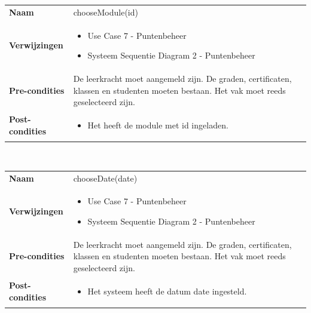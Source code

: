 \documentclass[a4paper]{article}
\begin{document}
\begin{tabularx}{\textwidth}{|l X|}
    \hline
    \textbf{Naam} & chooseModule(id) \\
    \textbf{Verwijzingen} & \begin{itemize}[leftmargin=*]
        \item Use Case 7 - Puntenbeheer
        \item Systeem Sequentie Diagram 2 - Puntenbeheer
    \end{itemize}\\
    \textbf{Pre-condities} & De leerkracht moet aangemeld zijn. De graden, certificaten, klassen en studenten moeten bestaan. Het vak moet reeds geselecteerd zijn.\\
    \textbf{Post-condities} & \begin{itemize}[leftmargin=*]
        \item Het heeft de module met id ingeladen.
    \end{itemize}\\
    \hline
\end{tabularx}\\

\begin{tabularx}{\textwidth}{|l X|}
    \hline
    \textbf{Naam} & chooseDate(date) \\
    \textbf{Verwijzingen} & \begin{itemize}[leftmargin=*]
        \item Use Case 7 - Puntenbeheer
        \item Systeem Sequentie Diagram 2 - Puntenbeheer
    \end{itemize}\\
    \textbf{Pre-condities} & De leerkracht moet aangemeld zijn. De graden, certificaten, klassen en studenten moeten bestaan. Het vak moet reeds geselecteerd zijn.\\
    \textbf{Post-condities} & \begin{itemize}[leftmargin=*]
        \item Het systeem heeft de datum date ingesteld.
    \end{itemize}\\
    \hline
\end{tabularx}\\
\end{document}
